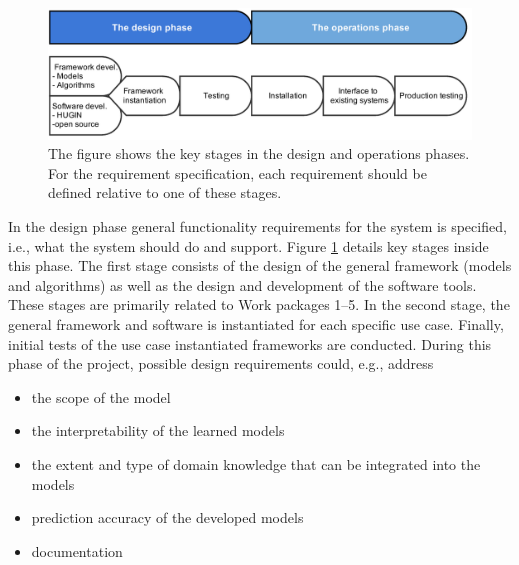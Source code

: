 
\begin{figure}[htbp]
\centering
\includegraphics [keepaspectratio,width = 14cm] {amidst_phases}
\caption{The figure shows the key stages in the design and operations phases. For the requirement specification, each
  requirement should be defined relative to one of these stages.} 
\label{REprocess2}
\end{figure}




In the design phase  general functionality requirements for the system is specified, i.e., what the system should do and support.
Figure \ref{REprocess2} details key stages inside this phase. The first stage consists of the design of the general
framework (models and algorithms) as well as the design and development of the software tools. These stages are primarily
related to Work packages 1--5. In the second stage, the general framework and software is instantiated for each specific
use case. Finally, initial tests of the use case instantiated frameworks are conducted.  During this phase of the project, possible design requirements could, e.g., address
\begin{itemize}
 \item the scope of the model
 \item the interpretability of the learned models
 \item the extent and type of domain knowledge that can be integrated into the models
 \item prediction accuracy of the developed models
 \item documentation
\end{itemize}

